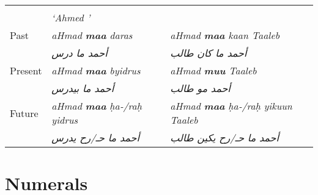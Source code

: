 \documentclass[oneside,a4paper]{article}
\newcommand{\trans}[1]{\textit{\hyphenpenalty=10000#1}}
\newcommand{\page}[1]{\marginnote{\normalsize{\upshape(#1)}}}
\begin{document}
  \begin{tabularx}{\linewidth}{l>{\itshape}Y>{\itshape}Y}

                &            &  \\
                & `Ahmed '&\\
  \midrule
    Past        & aHmad \textbf{maa} daras              & aHmad \textbf{maa} kaan Taaleb          \\
                & \hfill\textarabic{أحمد ما درس}       & \hfill\textarabic{أحمد ما كان طالب}  \\
    Present     & aHmad \textbf{maa} byidrus           & aHmad \textbf{muu} Taaleb               \\
                & \hfill\textarabic{أحمد ما بيدرس}     & \hfill\textarabic{أحمد مو طالب} \\
    Future      & aHmad \textbf{maa} ḥa‑/raḥ yidrus    & aHmad \textbf{maa} ḥa‑/raḥ yikuun Taaleb\\
                & \hfill\textarabic{أحمد ما حـ/رح يدرس} & \hfill\textarabic{أحمد ما حـ/رح يكين طالب}\\
  \bottomrule

\end{tabularx}


\pagebreak
\section{Numerals} \page{170f}

\newcommand{\onetwoinfo}{The numerals \textit{one} and \textit{two} are used only for emphasis or contrast, or when ordering in restaurants (\trans{itneen shaay} `two tee'). Otherwise, the lone noun in singular or dual is used.}
\newcommand{\threeteninfo}{The \textit{absolute} form of the numeral is used when it not followed by a noun, hand the \textit{construct} form when it followed by a noun: \trans{tlatt awlaad} `three boys.' Numerals 3--10 have a special construct form with a final~\trans{-t} when used with one of three nouns \trans{ayyaam} 'days', \trans{shuhuur} 'months', and \trans{aalaaf} 'thousands': \trans{khamst ayyam} 'five days'.} 
\newcommand{\teensinfo}{Numerals 11---19 are constructed of the unit number and the ending \trans{‑taʿsh}, with som irregularites in 11, 12, and 15. On the construct form the suffix~\trans{-ar} is added.} 
\newcommand{\cententialinfo}{Cententials are constructed of the construct form of the unit and the ending \trans{‑iin}, with only 20 having an irregular form. In complex numbers, the unit number appear before the centential in its absolute form. The unite and the centential are connected with the conjuction~\trans{u-}: \trans{sabʿa u‑tlaatin}, `thirty‑six'.} 
\end{document}
